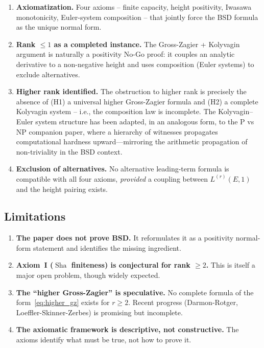 \documentclass[aps,prd,twocolumn,superscriptaddress,nofootinbib]{revtex4-2}
\theoremstyle{definition}
\theoremstyle{remark}
\DeclareMathOperator{\Sha}{Sha}
\begin{document}
\begin{enumerate}
\item \textbf{Axiomatization.} Four axioms -- finite capacity, height positivity, Iwasawa monotonicity, Euler-system composition -- that jointly force the BSD formula as the unique normal form.

\item \textbf{Rank $\leq 1$ as a completed instance.} The Gross-Zagier + Kolyvagin argument is naturally a positivity No-Go proof: it couples an analytic derivative to a non-negative height and uses composition (Euler systems) to exclude alternatives.

\item \textbf{Higher rank identified.} The obstruction to higher rank is precisely the absence of (H1) a universal higher Gross-Zagier formula and (H2) a complete Kolyvagin system -- i.e., the composition law is incomplete. The Kolyvagin--Euler system structure has been adapted, in an analogous form, to the P vs NP companion paper, where a hierarchy of witnesses propagates computational hardness upward---mirroring the arithmetic propagation of non-triviality in the BSD context.

\item \textbf{Exclusion of alternatives.} No alternative leading-term formula is compatible with all four axioms, \textit{provided} a coupling between $L^{(r)}(E,1)$ and the height pairing exists.
\end{enumerate}

\subsection{Limitations}

\begin{enumerate}
\item \textbf{The paper does not prove BSD.} It reformulates it as a positivity normal-form statement and identifies the missing ingredient.

\item \textbf{Axiom~I ($\Sha$ finiteness) is conjectural for rank $\geq 2$.} This is itself a major open problem, though widely expected.

\item \textbf{The ``higher Gross-Zagier'' is speculative.} No complete formula of the form~\eqref{eq:higher_gz} exists for $r \geq 2$. Recent progress (Darmon-Rotger, Loeffler-Skinner-Zerbes) is promising but incomplete.

\item \textbf{The axiomatic framework is descriptive, not constructive.} The axioms identify what must be true, not how to prove it.
\end{enumerate}
\end{document}
